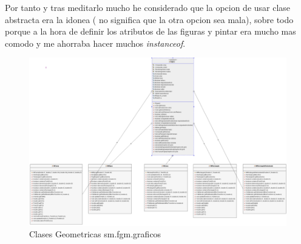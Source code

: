Por tanto y tras meditarlo mucho he considerado que la opcion de usar clase abstracta era la idonea ( no significa que la otra opcion sea mala), sobre todo porque a la hora de definir los atributos de las figuras y pintar era mucho mas comodo y me ahorraba hacer muchos \emph{instanceof}. 
\begin{figure}[H]
  \centering
    \includegraphics[scale=0.51]{images/smfgmgraficos2}
  \caption{Clases Geometricas sm.fgm.graficos}
  \label{Clases Geometricas sm.fgm.graficos}
\end{figure}

